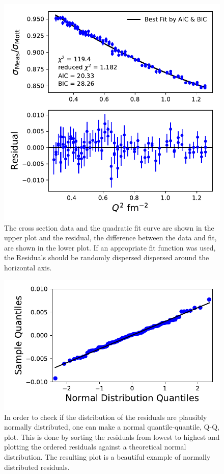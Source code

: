 \documentclass[10pt,aps,prc,twocolumn]{revtex4-1}
\begin{document}
\begin{figure}[htb]
\includegraphics[width=\columnwidth]{Figure/NewVsOld.pdf}
\caption{The cross section data and the quadratic fit curve are shown in the upper plot and the residual, the difference between
the data and fit, are shown in the lower plot.    If an appropriate fit function was used, the Residuals should be randomly dispersed
dispersed around the horizontal axis.}
\label{residual}
\end{figure}

\begin{figure}[htb]
\includegraphics[width=\columnwidth]{Figure/NormQQ.pdf}
\caption{In order to check if the distribution of the residuals are plausibly normally distributed, one can make a normal
 quantile-quantile, Q-Q, plot.
This is done by sorting the residuals from lowest to highest and plotting the ordered residuals against a theoretical 
normal distribution.   The resulting plot is a beautiful example of normally distributed residuals.}
\label{normqq}
\end{figure}
\end{document}
